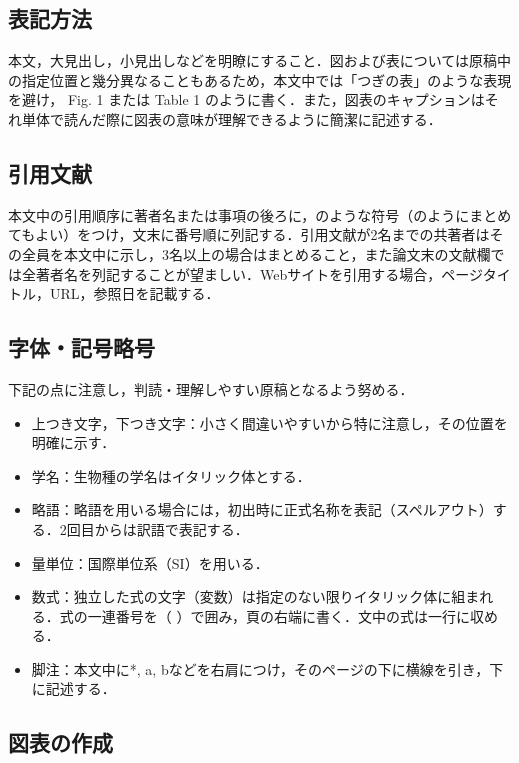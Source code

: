 \documentclass[10pt,a4paper,autodetect-engine,dvipdfmx]{jsarticle} %
\begin{document}
\begin{multicols}{2}
\subsection{表記方法}

本文，大見出し，小見出しなどを明瞭にすること．図および表については原稿中の指定位置と幾分異なることもあるため，本文中では「つぎの表」のような表現を避け， Fig. 1 または Table 1 のように書く．また，図表のキャプションはそれ単体で読んだ際に図表の意味が理解できるように簡潔に記述する．

\subsection{引用文献}

本文中の引用順序に著者名または事項の後ろに\cite{rafferty1994}，\cite{vconf2023}のような符号（\cite{okatani2015,kataoka2016}のようにまとめてもよい）をつけ，文末に番号順に列記する．引用文献が2名までの共著者はその全員を本文中に示し，3名以上の場合はまとめること，また論文末の文献欄では全著者名を列記することが望ましい．Webサイトを引用する場合，ページタイトル，URL，参照日を記載する．

\subsection{字体・記号略号}

下記の点に注意し，判読・理解しやすい原稿となるよう努める．

\begin{itemize}
\item 上つき文字，下つき文字：小さく間違いやすいから特に注意し，その位置を明確に示す．
\item 学名：生物種の学名はイタリック体とする．
\item 略語：略語を用いる場合には，初出時に正式名称を表記（スペルアウト）する．2回目からは訳語で表記する．
\item 量単位：国際単位系（SI）を用いる．
\item 数式：独立した式の文字（変数）は指定のない限りイタリック体に組まれる．式の一連番号を（ ）で囲み，頁の右端に書く．文中の式は一行に収める．
\item 脚注：本文中に*, a, bなどを右肩につけ，そのページの下に横線を引き，下に記述する．
\end{itemize}

\subsection{図表の作成}


\end{multicols}
\end{document}
